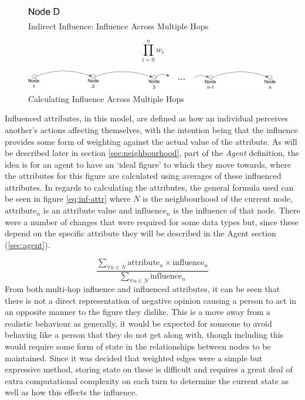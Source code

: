 \documentclass[]{report}
\begin{document}
\begin{figure}
\label{img:multihop-inf}
\begin{center}
\includegraphics[scale=0.75]{multi-inf.png}
\end{center}
\caption{Indirect Influence: Influence Across Multiple Hops}
\end{figure}

\begin{equation}
\label{eq:multihop-inf}
\prod_{i=0}^{n}w_{i}
\end{equation}

\begin{figure}
\label{img:multihop-inf-calc}
\begin{center}
\includegraphics[scale=0.75]{multihop-inf.png}
\end{center}
\caption{Calculating Influence Across Multiple Hops}
\end{figure}
Influenced attributes, in this model, are defined as how an individual perceives another's actions affecting themselves, with the intention being that the influence provides some form of weighting against the actual value of the attribute. As will be described later in section \ref{sec:neighbourhood}, part of the \emph{Agent} definition, the idea is for an agent to have an `ideal figure' to which they move towards, where the attributes for this figure are calculated using averages of these influenced attributes. In regards to calculating the attributes, the general formula used can be seen in figure \ref{eq:inf-attr} where $N$ is the neighbourhood of the current node, $\text{attribute}_{n}$ is an attribute value and $\text{influence}_{n}$ is the influence of that node. There were a number of changes that were required for some data types but, since these depend on the specific attribute they will be described in the Agent section (\ref{sec:agent}).

\begin{equation}
\label{eq:inf-attr}
\frac{\sum_{\forall n \in N} \text{attribute}_{n} \times \text{influence}_{n}}{\sum_{\forall n \in N}\text{influence}_{n}}
\end{equation}
From both multi-hop influence and influenced attributes, it can be seen that there is not a direct representation of negative opinion causing a person to act in an opposite manner to the figure they dislike. This is a move away from a realistic behaviour as generally, it would be expected for someone to avoid behaving like a person that they do not get along with, though including this would require some form of state in the relationships between nodes to be maintained. Since it was decided that weighted edges were a simple but expressive method, storing state on these is difficult and requires a great deal of extra computational complexity on each turn to determine the current state as well as how this effects the influence.
\end{document}
